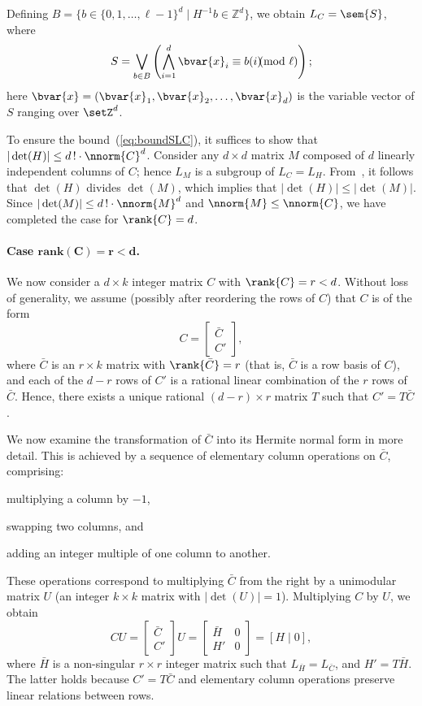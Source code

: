 Defining $B = \{b \in \{0, 1, \dots, \ell{-}1\}^d \mid H^{-1}b \in \mathbb{Z}^d\}$, we obtain $L_C = \sem{S}$, where 
\[
    S = \bigvee_{b \in B} \left( \bigwedge_{i=1}^d \bvar{x}_i \equiv
    b(i) \!\!\!\! \pmod \ell \right);
\]
here $\bvar{x} = (\bvar{x}_1,\bvar{x}_2, \dots, \bvar{x}_d)$ is the
variable vector of $S$ ranging over $\setZ^d$.

To ensure the bound~(\ref{eq:boundSLC}),
it suffices to show that $|\det(H)|\leq d\,!\cdot\nnorm{C}^d$.
Consider any $d\times d$ matrix $M$ composed of $d$
linearly independent columns of $C$; hence $L_M$ is a subgroup of
$L_C=L_H$.
From~\cite[Chapter 4]{schrijver1986theory}, it follows that $\det(H)$
divides $\det(M)$, which implies that $|\det(H)|\leq |\det(M)|$.
Since $|\det(M)|\leq d\,!\cdot\nnorm{M}^d$ and
$\nnorm{M}\leq \nnorm{C}$, we have completed the case for
$\rank{C}=d$.

\paragraph{Case $\bm{\text{rank}(C)=r<d}$.}
We now consider a $d \times k$ integer matrix $C$ with $\rank{C} = r < d$. Without loss of generality, we assume (possibly after reordering the rows of $C$) that $C$ is of the form
\[
	C = \begin{bmatrix} \bar{C} \\ C' \end{bmatrix},
\]
where $\bar{C}$ is an $r \times k$ matrix with $\rank{\bar{C}} = r$
(that is, $\bar{C}$ is a row basis of $C$), and each of the $d-r$ rows
of $C'$ is a rational linear combination of the $r$ rows of $\bar{C}$.
Hence, there exists a unique rational $(d-r) \times r$ matrix $T$ such
that $C' = T\bar{C}$.

We now examine the transformation of $\bar{C}$ into its Hermite normal
form in more detail. This is achieved by a sequence of elementary
column operations on $\bar{C}$, comprising: 
\begin{enumerate*}[(i)]
    \item multiplying a column by $-1$, 
    \item swapping two columns, and 
    \item adding an integer multiple of one column to another.
\end{enumerate*}
These operations correspond to multiplying $\bar{C}$ from the right by a unimodular matrix $U$ (an integer $k \times k$ matrix with $|\det(U)| = 1$). Multiplying $C$ by $U$, we obtain
\[
	CU = \begin{bmatrix} \bar{C} \\ C' \end{bmatrix} U = 
		\begin{bmatrix} \bar{H} & 0 \\ H' & 0 \end{bmatrix} = [H \mid 0],
\]
where $\bar{H}$ is a non-singular $r \times r$ integer matrix such
that $L_{\bar{H}}
= L_{\bar{C}}$, and $H' = T\bar{H}$. The latter holds because $C' = T\bar{C}$ and elementary column operations preserve linear relations between rows.

